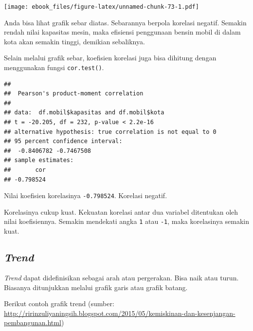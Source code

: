 \documentclass[openany]{book}
\newenvironment{Shaded}{\begin{snugshade}}{\end{snugshade}}
\newcommand{\KeywordTok}[1]{\textcolor[rgb]{0.13,0.29,0.53}{\textbf{#1}}}
\newcommand{\CommentTok}[1]{\textcolor[rgb]{0.56,0.35,0.01}{\textit{#1}}}
\newcommand{\OperatorTok}[1]{\textcolor[rgb]{0.81,0.36,0.00}{\textbf{#1}}}
\newcommand{\NormalTok}[1]{#1}
\begin{document}
\texttt{[image: ebook\_files/figure-latex/unnamed-chunk-73-1.pdf]}

Anda bisa lihat grafik sebar diatas. Sebarannya berpola korelasi
negatif. Semakin rendah nilai kapasitas mesin, maka efisiensi penggunaan
bensin mobil di dalam kota akan semakin tinggi, demikian sebaliknya.

Selain melalui grafik sebar, koefisien korelasi juga bisa dihitung
dengan menggunakan fungsi \texttt{cor.test()}.

\begin{Shaded}
\end{Shaded}

\begin{verbatim}
## 
##  Pearson's product-moment correlation
## 
## data:  df.mobil$kapasitas and df.mobil$kota
## t = -20.205, df = 232, p-value < 2.2e-16
## alternative hypothesis: true correlation is not equal to 0
## 95 percent confidence interval:
##  -0.8406782 -0.7467508
## sample estimates:
##       cor 
## -0.798524
\end{verbatim}

Nilai koefisien korelasinya \texttt{-0.798524}. Korelasi negatif.

Korelasinya cukup kuat. Kekuatan korelasi antar dua variabel ditentukan
oleh nilai koefisiennya. Semakin mendekati angka \texttt{1} atau
\texttt{-1}, maka korelasinya semakin kuat.

\subsection{\texorpdfstring{\emph{Trend}}{Trend}}\label{trend}

\emph{Trend} dapat didefinisikan sebagai arah atau pergerakan. Bisa naik
atau turun. Biasanya ditunjukkan melalui grafik garis atau grafik
batang.

Berikut contoh grafik trend (sumber:
\url{http://ririnzuliyaningsih.blogspot.com/2015/05/kemiskinan-dan-kesenjangan-pembangunan.html})
\end{document}
